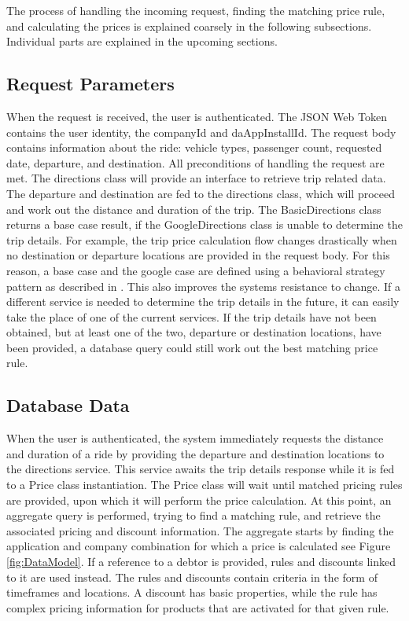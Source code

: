 The process of handling the incoming request, finding the matching price rule, and calculating the prices is explained coarsely in the following subsections. Individual parts are explained in the upcoming sections.

\subsection{Request Parameters}
When the request is received, the user is authenticated. The JSON Web Token contains the user identity, the companyId and daAppInstallId. The request body contains information about the ride: vehicle types, passenger count, requested date, departure, and destination. All preconditions of handling the request are met. The directions class will provide an interface to retrieve trip related data. The departure and destination are fed to the directions class, which will proceed and work out the distance and duration of the trip. The BasicDirections class returns a base case result, if the GoogleDirections class is unable to determine the trip details. For example, the trip price calculation flow changes drastically when no destination or departure locations are provided in the request body. For this reason, a base case and the google case are defined using a behavioral strategy pattern as described in \cite{gof}. This also improves the systems resistance to change. If a different service is needed to determine the trip details in the future, it can easily take the place of one of the current services. If the trip details have not been obtained, but at least one of the two, departure or destination locations, have been provided, a database query could still work out the best matching price rule.

\subsection{Database Data}
When the user is authenticated, the system immediately requests the distance and duration of a ride by providing the departure and destination locations to the directions service. This service awaits the trip details response while it is fed to a Price class instantiation. The Price class will wait until matched pricing rules are provided, upon which it will perform the price calculation. At this point, an aggregate query is performed, trying to find a matching rule, and retrieve the associated pricing and discount information. The aggregate starts by finding the application and company combination for which a price is calculated see Figure \ref{fig:DataModel}. If a reference to a debtor is provided, rules and discounts linked to it are used instead. The rules and discounts contain criteria in the form of timeframes and locations. A discount has basic properties, while the rule has complex pricing information for products that are activated for that given rule.

